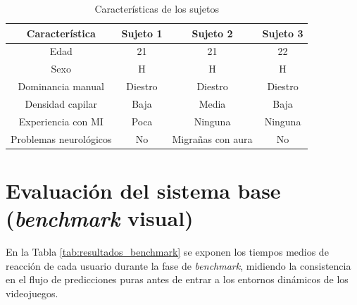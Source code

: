 \begin{table}[h]
      \centering
      \begin{tabular}{|c|c|c|c|}
            \hline
            \textbf{Característica}   & \textbf{Sujeto 1} & \textbf{Sujeto 2} & \textbf{Sujeto 3} \\
            \hline

            Edad                      & 21                & 21                & 22                \\ \hline Sexo & H & H & H \\ \hline Dominancia manual &
            Diestro                   & Diestro           & Diestro                               \\ \hline Densidad capilar & Baja & Media & Baja \\
            \hline Experiencia con MI & Poca              & Ninguna           & Ninguna           \\ \hline Problemas
            neurológicos              & No                & Migrañas con aura & No                \\ \hline

      \end{tabular}
      \caption{Características de los sujetos}
      \label{tab:sujetos}
\end{table}

\section{Evaluación del sistema base (\textit{benchmark} visual)}
\label{sec:rt_res_benchmark}
En la Tabla \ref{tab:resultados_benchmark} se exponen los tiempos medios de reacción de cada usuario durante la fase de \textit{benchmark}, midiendo la consistencia en el flujo de predicciones puras antes de entrar a los entornos dinámicos de los videojuegos.

\begin{table}[h!]
      \centering
      \caption{Tiempos de reacción en el \textit{benchmark} visual (\textit{dualArrowComponent}).}
      \label{tab:resultados_benchmark}
\end{table}

